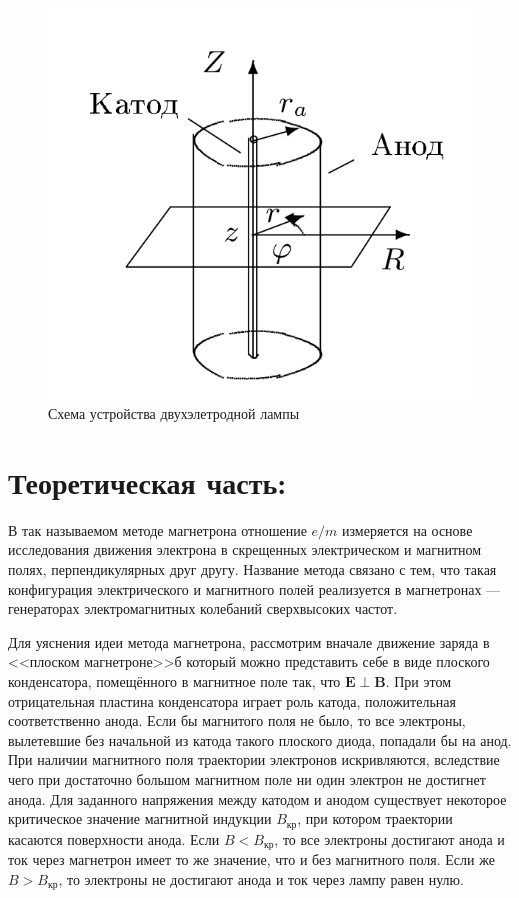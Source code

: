\documentclass[a4paper, fontsize=14pt]{article}
\begin{document}
\begin{figure}[H]
\center
\includegraphics[scale=0.4]{ust1.png}
\caption{Схема устройства двухэлетродной лампы}
\end{figure}

\section*{Теоретическая часть:}
В так называемом методе магнетрона отношение $e / m$ измеряется на основе исследования движения электрона в скрещенных электрическом и магнитном полях, перпендикулярных друг другу. Название метода связано с тем, что такая конфигурация электрического и магнитного полей реализуется в магнетронах --- генераторах электромагнитных колебаний сверхвысоких частот.

Для уяснения идеи метода магнетрона, рассмотрим вначале движение заряда в <<плоском магнетроне>>б который можно представить себе в виде плоского конденсатора, помещённого в магнитное поле так, что $\boldsymbol{E} \perp \boldsymbol{B}$. При этом отрицательная пластина конденсатора играет роль катода, положительная соответственно анода.  Если бы магнитого поля не было, то все электроны, вылетевшие без начальной из катода такого плоского диода, попадали бы на анод. При наличии магнитного поля траектории электронов искривляются, вследствие чего при достаточно большом магнитном поле ни один электрон не достигнет анода.
Для заданного напряжения между катодом и анодом существует некоторое критическое значение магнитной индукции $B_\text{кр}$, при котором траектории касаются поверхности анода. Если $B < B_\text{кр}$, то все электроны достигают анода и ток через магнетрон имеет то же значение, что и без магнитного поля. Если же $B > B_\text{кр}$, то электроны не достигают анода и ток через лампу равен нулю.
\end{document}
